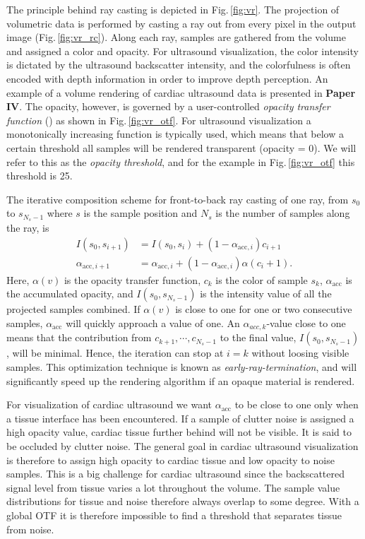The principle behind ray casting is depicted in Fig.\,\ref{fig:vr}. The projection of volumetric data is performed by casting a ray out from every pixel in the output image (Fig.\,\ref{fig:vr_rc}). Along each ray, samples are gathered from the volume and assigned a color and opacity. For ultrasound visualization, the color intensity is dictated by the ultrasound backscatter intensity, and the colorfulness is often encoded with depth information in order to improve depth perception. An example of a volume rendering of cardiac ultrasound data is presented in \textbf{Paper IV}. The opacity, however, is governed by a user-controlled \textit{opacity transfer function} () as shown in Fig.\,\ref{fig:vr_otf}. For ultrasound visualization a monotonically increasing function is typically used, which means that below a certain threshold all samples will be rendered transparent (opacity = 0). We will refer to this as the \textit{opacity threshold}, and for the example in Fig.\,\ref{fig:vr_otf} this threshold is 25.

The iterative composition scheme for front-to-back ray casting of one ray, from $s_0$ to $s_{N_s-1}$ where $s$ is the sample position and $N_s$ is the number of samples along the ray, is \cite{rtvg2006}
\begin{align}
I(s_0, s_{i+1}) &= I(s_0, s_{i}) + (1 - \alpha_{\text{acc},i}) c_{i+1}\\
\alpha_{\text{acc},i+1} &= \alpha_{\text{acc},i} + (1 - \alpha_{\text{acc},i}) \alpha(c_i+1).
\label{eq:fronToBack}
\end{align}
Here, $\alpha(v)$ is the opacity transfer function, $c_{k}$ is the color of sample $s_{k}$, $\alpha_{\text{acc}}$ is the accumulated opacity, and $I(s_0, s_{N_s-1})$ is the intensity value of all the projected samples combined. If $\alpha(v)$ is close to one for one or two consecutive samples, $\alpha_{\text{acc}}$ will quickly approach a value of one. An $\alpha_{acc,k}$-value close to one means that the contribution from $c_{k+1}, \cdots, c_{N_s-1}$ to the final value, $I(s_0, s_{N_s-1})$, will be minimal. Hence, the iteration can stop at $i=k$ without loosing visible samples. This optimization technique is known as \textit{early-ray-termination}, and will significantly speed up the rendering algorithm if an opaque material is rendered.

For visualization of cardiac ultrasound we want $\alpha_{\text{acc}}$ to be close to one only when a tissue interface has been encountered. If a sample of clutter noise is assigned a high opacity value, cardiac tissue further behind will not be visible. It is said to be occluded by clutter noise. The general goal in cardiac ultrasound visualization is therefore to assign high opacity to cardiac tissue and low opacity to noise samples. This is a big challenge for cardiac ultrasound since the backscattered signal level from tissue varies a lot throughout the volume. The sample value distributions for tissue and noise therefore always overlap to some degree. With a global OTF it is therefore impossible to find a threshold that separates tissue from noise.

